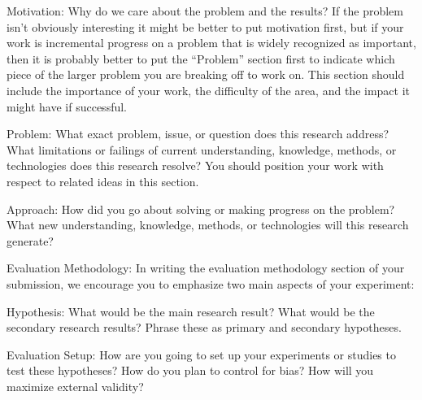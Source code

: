 \documentclass[11pt]{article}
\begin{document}
Motivation: Why do we care about the problem and the results? If the problem isn’t obviously interesting it might be better to put motivation first, but if your work is incremental progress on a problem that is widely recognized as important, then it is probably better to put the “Problem” section first to indicate which piece of the larger problem you are breaking off to work on. This section should include the importance of your work, the difficulty of the area, and the impact it might have if successful.

Problem: What exact problem, issue, or question does this research address? What limitations or failings of current understanding, knowledge, methods, or technologies does this research resolve? You should position your work with respect to related ideas in this section.

Approach: How did you go about solving or making progress on the problem? What new understanding, knowledge, methods, or technologies will this research generate?

Evaluation Methodology: In writing the evaluation methodology section of your submission, we encourage you to emphasize two main aspects of your experiment:

Hypothesis: What would be the main research result? What would be the secondary research results? Phrase these as primary and secondary hypotheses.

Evaluation Setup: How are you going to set up your experiments or studies to test these hypotheses? How do you plan to control for bias? How will you maximize external validity?
\end{document}
